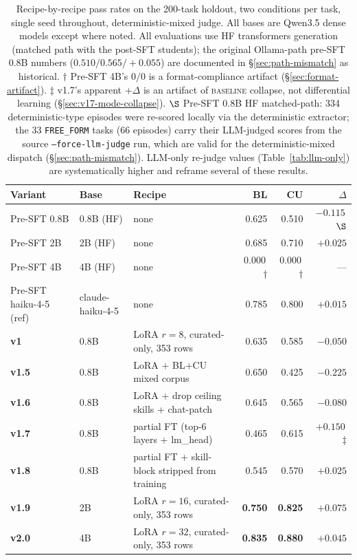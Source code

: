 \documentclass[10pt]{article}
\newcommand{\BL}{\textsc{baseline}\xspace}
\begin{document}
\begin{table}[h]
\centering
\small
\begin{tabularx}{\textwidth}{@{}l l Y r r r@{}}
\toprule
\textbf{Variant} & \textbf{Base} & \textbf{Recipe} & \textbf{BL} & \textbf{CU} & \textbf{$\Delta$} \\
\midrule
Pre-SFT 0.8B & 0.8B (HF)     & none & 0.625 & 0.510 & $-0.115$\,$\S$ \\
Pre-SFT 2B   & 2B (HF)       & none & 0.685 & 0.710 & $+0.025$ \\
Pre-SFT 4B   & 4B (HF)       & none & $0.000$\,$\dagger$ & $0.000$\,$\dagger$ & --- \\
Pre-SFT haiku-4-5 (ref) & claude-haiku-4-5 & none & 0.785 & 0.800 & $+0.015$ \\
\addlinespace
\textbf{v1}    & 0.8B & LoRA $r{=}8$, curated-only, 353 rows           & 0.635 & 0.585 & $-0.050$ \\
\textbf{v1.5}  & 0.8B & LoRA + BL+CU mixed corpus                       & 0.650 & 0.425 & $-0.225$ \\
\textbf{v1.6}  & 0.8B & LoRA + drop ceiling skills + chat-patch         & 0.645 & 0.565 & $-0.080$ \\
\textbf{v1.7}  & 0.8B & partial FT (top-6 layers + lm\_head)            & 0.465 & 0.615 & $+0.150$\,$\ddagger$ \\
\textbf{v1.8}  & 0.8B & partial FT + skill-block stripped from training & 0.545 & 0.570 & $+0.025$ \\
\textbf{v1.9}  & 2B   & LoRA $r{=}16$, curated-only, 353 rows           & \textbf{0.750} & \textbf{0.825} & $\boldsymbol{+0.075}$ \\
\textbf{v2.0}  & 4B   & LoRA $r{=}32$, curated-only, 353 rows           & \textbf{0.835} & \textbf{0.880} & $\boldsymbol{+0.045}$ \\
\bottomrule
\end{tabularx}
\caption{Recipe-by-recipe pass rates on the 200-task holdout, two conditions per task, single seed throughout, deterministic-mixed judge. All bases are Qwen3.5 dense models except where noted. All evaluations use HF transformers generation (matched path with the post-SFT students); the original Ollama-path pre-SFT 0.8B numbers ($0.510 / 0.565 / +0.055$) are documented in \S\ref{sec:path-mismatch} as historical. $\dagger$ Pre-SFT 4B's $0/0$ is a format-compliance artifact (\S\ref{sec:format-artifact}). $\ddagger$ v1.7's apparent $+\Delta$ is an artifact of \BL{} collapse, not differential learning (\S\ref{sec:v17-mode-collapse}). $\S$ Pre-SFT 0.8B HF matched-path: 334 deterministic-type episodes were re-scored locally via the deterministic extractor; the 33 \texttt{FREE\_FORM} tasks (66 episodes) carry their LLM-judged scores from the source \texttt{--force-llm-judge} run, which are valid for the deterministic-mixed dispatch (\S\ref{sec:path-mismatch}). LLM-only re-judge values (Table~\ref{tab:llm-only}) are systematically higher and reframe several of these results.}
\label{tab:headline}
\end{table}
\end{document}
